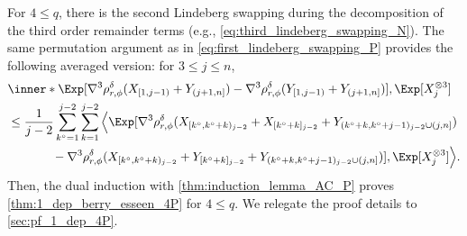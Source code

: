\documentclass[aos]{imsart}
\begin{document}
For $4 \leq q$, there is the second Lindeberg swapping during the decomposition of the third order remainder terms (e.g., \cref{eq:third_lindeberg_swapping_N}). The same permutation argument as in \cref{eq:first_lindeberg_swapping_P} provides the following averaged version: for $3 \leq j \leq n$,
\begin{equation} \label{eq:third_lindeberg_swapping_P}
\begin{aligned}
    & \inner*{ 
        \Exp[\nabla^3 \rho_{r,\phi}^{\delta}(X_{[1,j-1)} + Y_{(j+1,n]})
        - \nabla^3 \rho_{r,\phi}^{\delta}(Y_{[1,j-1)} + Y_{(j+1,n]})], 
        \Exp[X_j^{\otimes 3}] } \\
    & \leq \frac{1}{j-2} \sum_{k^\circ=1}^{j-2} \sum_{k=1}^{j-2} \Big\langle
        \Exp[\nabla^3 \rho_{r,\phi}^{\delta}(X_{[k^\circ,k^\circ+k)_{j-2}} + X_{[k^\circ+k]_{j-2}} + Y_{(k^\circ+k,k^\circ+j-1)_{j-2}\cup(j,n]}) \\
    & \hspace{0.5in} - \nabla^3 \rho_{r,\phi}^{\delta}(X_{[k^\circ,k^\circ+k)_{j-2}} + Y_{[k^\circ+k]_{j-2}} + Y_{(k^\circ+k,k^\circ+j-1)_{j-2}\cup(j,n]})], 
        \Exp[X_j^{\otimes 3}] \Big\rangle. \\
\end{aligned}
\end{equation}
Then, the dual induction with \cref{thm:induction_lemma_AC_P} proves \cref{thm:1_dep_berry_esseen_4P} for $4 \leq q$. We relegate the proof details to \cref{sec:pf_1_dep_4P}.




%
%
\end{document}

